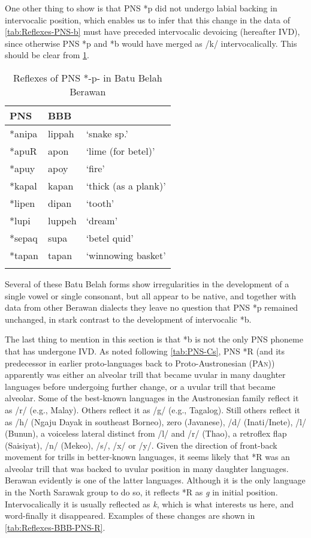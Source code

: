 \documentclass[output=paper]{langscibook}
\begin{document}
One other thing to show is that PNS *p did not undergo labial backing in intervocalic position, which enables us to infer that this change in the data of \cref{tab:Reflexes-PNS-b} must have preceded intervocalic devoicing (hereafter IVD), since otherwise PNS *p and *b would have merged as /k/ intervocalically. This should be clear from \cref{tab:Reflexes-BBB-PNS-p}.

\begin{table}[H]
\caption{\label{tab:Reflexes-BBB-PNS-p}Reflexes of PNS *-p- in Batu Belah Berawan}
\begin{tabular}{lll}
\lsptoprule
PNS      &  BBB       \\
\midrule
*anipa    &    lippah&    \enquote*{snake sp.}    \\
*apuR     &   apon   &    \enquote*{lime (for betel)}    \\
*apuy     &   apoy   &    \enquote*{fire}    \\
*kapal    &    kapan &    \enquote*{thick (as a plank)}    \\
*lipen    &    dipan &    \enquote*{tooth}    \\
*lupi     &   luppeh &    \enquote*{dream}    \\
*sepaq    &    supa  &    \enquote*{betel quid}    \\
*tapan    &    tapan &    \enquote*{winnowing basket}    \\
\lspbottomrule
\end{tabular}
\end{table}

Several of these Batu Belah forms show irregularities in the development of a single vowel or single consonant, but all appear to be native, and together with data from other Berawan dialects they leave no question that PNS *p remained unchanged, in stark contrast to the development of intervocalic *b.

The last thing to mention in this section is that *b is not the only PNS phoneme that has undergone IVD. As noted following \cref{tab:PNS-Cs}, PNS *R (and its predecessor in earlier proto-languages back to Proto-Austronesian (\textsc{PAn})) apparently was either an alveolar trill that became uvular in many daughter languages before undergoing further change, or a uvular trill that became alveolar. Some of the best-known languages in the Austronesian family reflect it as /r/ (e.g., Malay).  Others reflect it as /g/ (e.g., Tagalog).  Still others reflect it as /h/ (Ngaju Dayak in southeast Borneo), zero (Javanese), /d/ (Inati/Inete), /l/ (Bunun), a voiceless lateral distinct from /l/ and /r/ (Thao), a retroflex flap (Saisiyat), /n/ (Mekeo), /s/, /x/ or /y/. Given the direction of front-back movement for trills in better-known languages, it seems likely that *R was an alveolar trill that was backed to uvular position in many daughter languages. Berawan evidently is one of the latter languages. Although it is the only language in the North Sarawak group to do so, it reflects *R as \textit{g} in initial position. Intervocalically it is usually reflected as \textit{k}, which is what interests us here, and word-finally it disappeared. Examples of these changes are shown in \cref{tab:Reflexes-BBB-PNS-R}.
\end{document}
